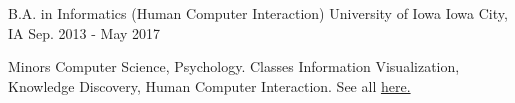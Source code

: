 \begin{cventries}
  \cventry
    {B.A. in Informatics (Human Computer Interaction)}
    {University of Iowa}
    {Iowa City, IA}
    {Sep. 2013 - May 2017}
    {
      \begin{cvitems}
        \begin{cvskills}
          \cvskill
            {Minors}
            {Computer Science, Psychology.}
          \cvskill
            {Classes}
            {Information Visualization, Knowledge Discovery, Human Computer Interaction. See all \href{https://www.github.com/ryan-p-larson/college-sankey/}{here.}}
        \end{cvskills}
      \end{cvitems}
    }
\end{cventries}
